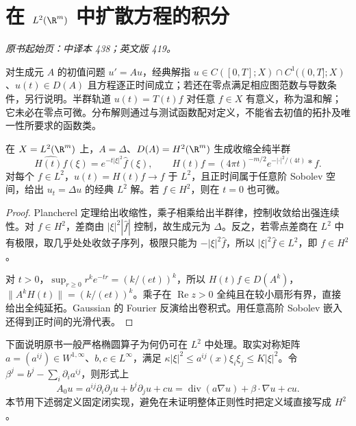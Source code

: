 \section{在 \texorpdfstring{$L^2(\R^m)$}{L2(Rm)} 中扩散方程的积分}\label{sec:yosida-14-01}
\noindent\textit{原书起始页：中译本 438；英文版 419。}

\begin{definition}[三种解的层次]
对生成元 $A$ 的初值问题 $u'=Au$，经典解指 $u\in C([0,T];X)\cap C^1((0,T];X)$、$u(t)\in D(A)$ 且方程逐正时间成立；若还在零点满足相应图范数与导数条件，另行说明。半群轨道 $u(t)=T(t)f$ 对任意 $f\in X$ 有意义，称为温和解；它未必在零点可微。分布解则通过与测试函数配对定义，不能省去初值的拓扑及唯一性所要求的函数类。
\end{definition}

\begin{theorem}\label{thm:y14-heat}
在 $X=L^2(\R^m)$ 上，$A=\Delta$、$D(A)=H^2(\R^m)$ 生成收缩全纯半群
\[
 \widehat{H(t)f}(\xi)=e^{-t|\xi|^2}\widehat f(\xi),\qquad
 H(t)f=(4\pi t)^{-m/2}e^{-|\cdot|^2/(4t)}*f.
\]
对每个 $f\in L^2$，$u(t)=H(t)f\to f$ 于 $L^2$，且正时间属于任意阶 Sobolev 空间，给出 $u_t=\Delta u$ 的经典 $L^2$ 解。若 $f\in H^2$，则在 $t=0$ 也可微。
\end{theorem}
\begin{proof}
Plancherel 定理给出收缩性，乘子相乘给出半群律，控制收敛给出强连续性。对 $f\in H^2$，差商由 $|\xi|^2|\widehat f|$ 控制，故生成元为 $\Delta$。反之，若零点差商在 $L^2$ 中有极限，取几乎处处收敛子序列，极限只能为 $-|\xi|^2\widehat f$，所以 $|\xi|^2\widehat f\in L^2$，即 $f\in H^2$。

对 $t>0$，$\sup_{r\ge0}r^ke^{-tr}=(k/(et))^k$，所以 $H(t)f\in D(A^k)$，$\|A^kH(t)\|=(k/(et))^k$。乘子在 $\operatorname{Re}z>0$ 全纯且在较小扇形有界，直接给出全纯延拓。Gaussian 的 Fourier 反演给出卷积式。用任意高阶 Sobolev 嵌入还得到正时间的光滑代表。
\end{proof}

下面说明原书一般严格椭圆算子为何仍可在 $L^2$ 中处理。取实对称矩阵 $a=(a^{ij})\in W^{1,\infty}$、$b,c\in L^\infty$，满足 $\kappa|\xi|^2\le a^{ij}(x)\xi_i\xi_j\le K|\xi|^2$。令 $\beta^j=b^j-\sum_i\partial_i a^{ij}$，则形式上
\[
 A_0u=a^{ij}\partial_i\partial_j u+b^j\partial_j u+cu
 =\operatorname{div}(a\nabla u)+\beta\cdot\nabla u+cu.
\]
本节用下述弱定义固定闭实现，避免在未证明整体正则性时把定义域直接写成 $H^2$。

